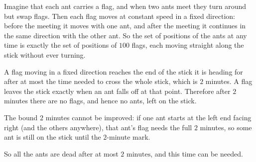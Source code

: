 Imagine that each ant carries a flag, and when two ants meet they turn around but swap flags. Then each flag moves at constant speed in a fixed direction: before the meeting it moves with one ant, and after the meeting it continues in the same direction with the other ant. So the set of positions of the ants at any time is exactly the set of positions of $100$ flags, each moving straight along the stick without ever turning.

A flag moving in a fixed direction reaches the end of the stick it is heading for after at most the time needed to cross the whole stick, which is $2$ minutes. A flag leaves the stick exactly when an ant falls off at that point. Therefore after $2$ minutes there are no flags, and hence no ants, left on the stick.

The bound $2$ minutes cannot be improved: if one ant starts at the left end facing right (and the others anywhere), that ant's flag needs the full $2$ minutes, so some ant is still on the stick until the $2$-minute mark.

So all the ants are dead after at most $\boxed{2\text{ minutes}}$, and this time can be needed.
